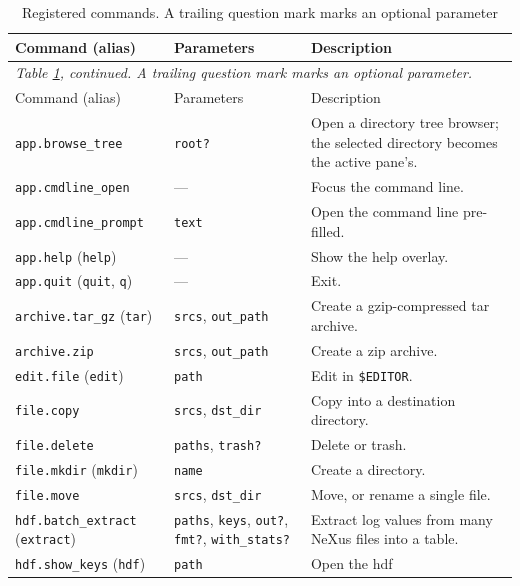 \documentclass[tm]{ornltm}
\begin{document}
\begin{small}
\begin{longtable}{p{} p{} p{}}
  \caption{Registered commands. A trailing question mark marks an optional
    parameter}
  \label{tab:allcommands} \\
  \toprule
  Command (alias) & Parameters & Description \\
  \midrule
  \endfirsthead
  \multicolumn{3}{l}{\emph{Table \ref{tab:allcommands}, continued. A trailing
    question mark marks an optional parameter.}} \\
  \toprule
  Command (alias) & Parameters & Description \\
  \midrule
  \endhead
  \bottomrule
  \endfoot
  \texttt{app.browse\_tree} & \texttt{root?} & Open a directory tree browser;
    the selected directory becomes the active pane's. \\
  \texttt{app.cmdline\_open} & --- & Focus the command line. \\
  \texttt{app.cmdline\_prompt} & \texttt{text} & Open the command line
    pre-filled. \\
  \texttt{app.help} (\texttt{help}) & --- & Show the help overlay. \\
  \texttt{app.quit} (\texttt{quit}, \texttt{q}) & --- & Exit. \\
  \texttt{archive.tar\_gz} (\texttt{tar}) & \texttt{srcs}, \texttt{out\_path} &
    Create a gzip-compressed tar archive. \\
  \texttt{archive.zip} & \texttt{srcs}, \texttt{out\_path} & Create a zip
    archive. \\
  \texttt{edit.file} (\texttt{edit}) & \texttt{path} & Edit in
    \texttt{\$EDITOR}. \\
  \texttt{file.copy} & \texttt{srcs}, \texttt{dst\_dir} & Copy into a
    destination directory. \\
  \texttt{file.delete} & \texttt{paths}, \texttt{trash?} & Delete or trash. \\
  \texttt{file.mkdir} (\texttt{mkdir}) & \texttt{name} & Create a directory. \\
  \texttt{file.move} & \texttt{srcs}, \texttt{dst\_dir} & Move, or rename a
    single file. \\
  \texttt{hdf.batch\_extract} (\texttt{extract}) & \texttt{paths},
    \texttt{keys}, \texttt{out?}, \texttt{fmt?}, \texttt{with\_stats?} &
    Extract log values from many NeXus files into a table. \\
  \texttt{hdf.show\_keys} (\texttt{hdf}) & \texttt{path} & Open the \ac{hdf}

\end{longtable}
\end{small}
\end{document}
